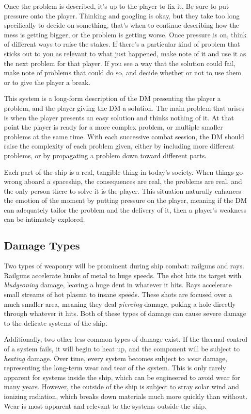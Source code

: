 \documentclass[a4paper]{article}
\begin{document}
Once the problem is described, it's up to the player to fix it. Be sure to put pressure onto the player. Thinking and googling is okay, but they take too long specifically to decide on something, that's when to continue describing how the mess is getting bigger, or the problem is getting worse. Once pressure is on, think of different ways to raise the stakes. If there's a particular kind of problem that sticks out to you as relevant to what just happened, make note of it and use it as the next problem for that player. If you see a way that the solution could fail, make note of problems that could do so, and decide whether or not to use them or to give the player a break.

This system is a long-form description of the DM presenting the player a problem, and the player giving the DM a solution. The main problem that arises is when the player presents an easy solution and thinks nothing of it. At that point the player is ready for a more complex problem, or multiple smaller problems at the same time. With each successive combat session, the DM should raise the complexity of each problem given, either by including more different problems, or by propagating a problem down toward different parts.

Each part of the ship is a real, tangible thing in today's society. When things go wrong aboard a spaceship, the consequences are real, the problems are real, and the only person there to solve it is the player. This situation naturally enhances the emotion of the moment by putting pressure on the player, meaning if the DM can adequately tailor the problem and the delivery of it, then a player's weakness can be intimately explored.

\subsection{Damage Types}

Two types of weaponry will be prominent during ship combat: railguns and rays. Railguns accelerate hunks of metal to huge speeds. The shot hits its target with \textit{bludgeoning} damage, leaving a huge dent in whatever it hits. Rays accelerate small streams of hot plasma to insane speeds. These shots are focused over a much smaller area, meaning they deal \textit{piercing} damage, poking a hole directly through whatever it hits. Both of these types of damage can cause severe damage to the delicate systems of the ship.

Additionally, two other less common types of damage exist. If the thermal control of a system fails, it will begin to heat up, and the component will be subject to \textit{heating} damage. Over time, every system becomes subject to \textit{wear} damage, representing the long-term wear and tear of the system. This is only rarely apparent for systems inside the ship, which can be engineered to avoid wear for many years. However, the outside of the ship is subject to stray solar wind and ionizing radiation, which breaks down materials much more quickly than without. Wear is most apparent and relevant to the systems outside the ship.
\end{document}

